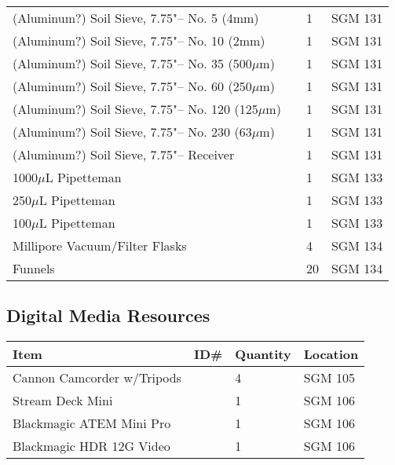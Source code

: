 \documentclass[12pt]{../SOP4_alpha}\usepackage[]{graphicx}\usepackage[]{color}
\begin{document}
\begin{tabular}{|l|l|l|l|}
(Aluminum?) Soil Sieve, 7.75"-- No. 5 (4mm) && 1  & SGM 131 \\
(Aluminum?) Soil Sieve, 7.75"-- No. 10 (2mm) && 1  & SGM 131 \\
(Aluminum?) Soil Sieve, 7.75"-- No. 35 (500$\mu$m) && 1  & SGM 131 \\
(Aluminum?) Soil Sieve, 7.75"-- No. 60 (250$\mu$m) && 1  & SGM 131 \\
(Aluminum?) Soil Sieve, 7.75"-- No. 120 (125$\mu$m) && 1  & SGM 131 \\
(Aluminum?) Soil Sieve, 7.75"-- No. 230 (63$\mu$m) && 1  & SGM 131 \\
(Aluminum?) Soil Sieve, 7.75"-- Receiver      && 1  & SGM 131 \\
1000$\mu$L Pipetteman       && 1 & SGM 133\\
250$\mu$L Pipetteman        && 1 & SGM 133\\
100$\mu$L Pipetteman        && 1& SGM 133\\
Millipore Vacuum/Filter Flasks && 4 & SGM 134 \\
Funnels                     && 20 & SGM 134\\
\hline
\end{tabular}

\subsection{Digital Media Resources}
\begin{tabular}{|l|l|l|l|}
\hline
Item      & ID\#  & Quantity & Location \\ \hline
Cannon Camcorder w/Tripods   && 4 & SGM 105 \\
Stream Deck Mini && 1 & SGM 106 \\
Blackmagic ATEM Mini Pro && 1 & SGM 106\\
Blackmagic HDR 12G Video && 1 & SGM 106\\
\hline
\end{tabular}
\end{document}
